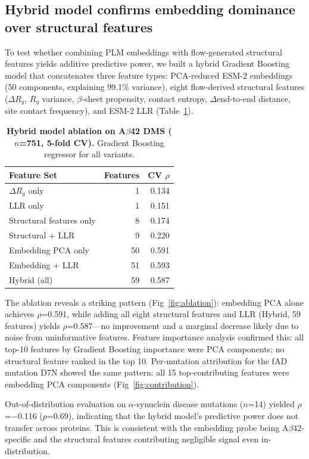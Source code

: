 \documentclass[10pt,letterpaper]{article}
\begin{document}
\subsection*{Hybrid model confirms embedding dominance over structural features}

To test whether combining PLM embeddings with flow-generated structural features yields additive predictive power, we built a hybrid Gradient Boosting model that concatenates three feature types: PCA-reduced ESM-2 embeddings (50 components, explaining 99.1\% variance), eight flow-derived structural features ($\Delta R_g$, $R_g$ variance, $\beta$-sheet propensity, contact entropy, $\Delta$end-to-end distance, site contact frequency), and ESM-2 LLR (Table~\ref{tab:hybrid}).

\begin{table}[h]
\centering
\caption{{\bf Hybrid model ablation on A$\beta$42 DMS ($n$=751, 5-fold CV).} Gradient Boosting regressor for all variants.}
\begin{tabular}{lrr}
\toprule
Feature Set & Features & CV $\rho$ \\
\midrule
$\Delta R_g$ only & 1 & 0.134 \\
LLR only & 1 & 0.151 \\
Structural features only & 8 & 0.174 \\
Structural + LLR & 9 & 0.220 \\
Embedding PCA only & 50 & 0.591 \\
Embedding + LLR & 51 & 0.593 \\
Hybrid (all) & 59 & 0.587 \\
\bottomrule
\end{tabular}
\label{tab:hybrid}
\end{table}

The ablation reveals a striking pattern (Fig~\ref{fig:ablation}): embedding PCA alone achieves $\rho$=0.591, while adding all eight structural features and LLR (Hybrid, 59 features) yields $\rho$=0.587---no improvement and a marginal decrease likely due to noise from uninformative features. Feature importance analysis confirmed this: all top-10 features by Gradient Boosting importance were PCA components; no structural feature ranked in the top 10. Per-mutation attribution for the fAD mutation D7N showed the same pattern: all 15 top-contributing features were embedding PCA components (Fig~\ref{fig:contribution}).

Out-of-distribution evaluation on $\alpha$-synuclein disease mutations ($n$=14) yielded $\rho$=$-$0.116 ($p$=0.69), indicating that the hybrid model's predictive power does not transfer across proteins. This is consistent with the embedding probe being A$\beta$42-specific and the structural features contributing negligible signal even in-distribution.
\end{document}
